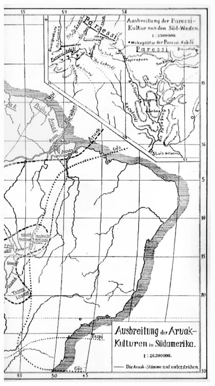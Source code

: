 \pagebreak
\thispagestyle{empty}

\begin{figure}[H]
\begin{absolutelynopagebreak}
\hspace*{-2cm}
  \includegraphics[width=\textwidth]{./MAPA_PINTADO_PT2.pdf}  

\end{absolutelynopagebreak}
\end{figure}
